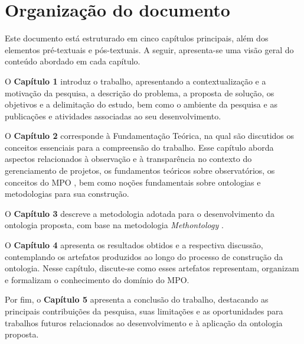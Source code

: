 \section{Organização do documento}

Este documento está estruturado em cinco capítulos principais, além dos elementos pré-textuais e pós-textuais. A seguir, apresenta-se uma visão geral do conteúdo abordado em cada capítulo.

O \textbf{Capítulo 1} introduz o trabalho, apresentando a contextualização e a motivação da pesquisa, a descrição do problema, a proposta de solução, os objetivos e a delimitação do estudo, bem como o ambiente da pesquisa e as publicações e atividades associadas ao seu desenvolvimento.

O \textbf{Capítulo 2} corresponde à Fundamentação Teórica, na qual são discutidos os conceitos essenciais para a compreensão do trabalho. Esse capítulo aborda aspectos relacionados à observação e à transparência no contexto do gerenciamento de projetos, os fundamentos teóricos sobre observatórios, os conceitos do MPO \cite{vieira2022thesis}, bem como noções fundamentais sobre ontologias e metodologias para sua construção.

O \textbf{Capítulo 3} descreve a metodologia adotada para o desenvolvimento da ontologia proposta, com base na metodologia \textit{Methontology} \cite{fernandez1997methontology}.

O \textbf{Capítulo 4} apresenta os resultados obtidos e a respectiva discussão, contemplando os artefatos produzidos ao longo do processo de construção da ontologia. Nesse capítulo, discute-se como esses artefatos representam, organizam e formalizam o conhecimento do domínio do MPO.

Por fim, o \textbf{Capítulo 5} apresenta a conclusão do trabalho, destacando as principais contribuições da pesquisa, suas limitações e as oportunidades para trabalhos futuros relacionados ao desenvolvimento e à aplicação da ontologia proposta.
